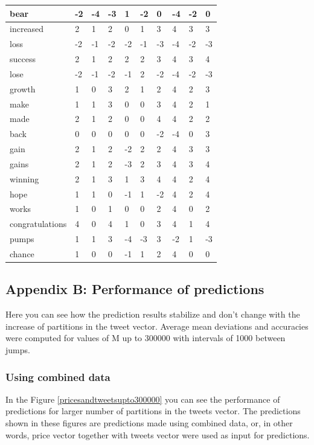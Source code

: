 \documentclass[a4paper,11pt,oneside]{article}
\begin{document}
\begin{center}
\begin{longtable}{| l | l | l | l | l | l | l | l | l | l |}
  		\hline
  		bear & -2&-4&-3&1&-2&0&-4&-2&0   \\
  		\hline
  		increased & 2&1&2&0&1&3&4&3&3 \\
  		\hline
  		loss & -2&-1&-2&-2&-1&-3&-4&-2&-3 \\
  		\hline
  		success & 2&1&2&2&2&3&4&3&4   \\
  		\hline
  		lose & -2&-1&-2&-1&2&-2&-4&-2&-3 \\
  		\hline
  		growth & 1&0&3&2&1&2&4&2&3 \\
  		\hline
  		make & 1&1&3&0&0&3&4&2&1 \\
  		\hline
  		made & 2&1&2&0&0&4&4&2&2 \\
  		\hline
  		back & 0 &0&0&0&0&-2&-4&0&3 \\
  		\hline
  		gain & 2&1&2&-2&2&2&4&3&3 \\
  		\hline
  		gains & 2&1&2&-3&2&3&4&3&4  \\
  		\hline
  		winning & 2&1&3&1&3&4&4&2&4   \\
  		\hline
  		hope & 1&1&0&-1&1&-2&4&2&4   \\
  		\hline
  		works & 1&0&1&0&0&2&4&0&2 \\
  		\hline
  		congratulations & 4&0&4&1&0&3&4&1&4   \\
  		\hline
  		pumps &  1&1&3&-4&-3&3&-2&1&-3\\
  		\hline
  		chance & 1&0&0&-1&1&2&4&0&0   \\
  		\hline
  \end{longtable}
  \end{center}
  
   \subsection{Appendix B: Performance of predictions}
   
   \label{furthererrors}
   
   Here you can see how the prediction results stabilize and don't change with the increase of partitions in the tweet vector. Average mean deviations and accuracies were computed for values of M up to 300000 with intervals of 1000 between jumps.
   
   \subsubsection{Using combined data}
   In the Figure \ref{pricesandtweetsupto300000} you can see the performance of predictions for larger number of partitions in the tweets vector. The predictions shown in these figures are predictions made using combined data, or, in other words, price vector together with tweets vector were used as input for predictions.
   
\end{document}
